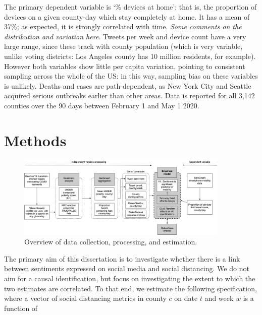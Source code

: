\documentclass{article}
\begin{document}
The primary dependent variable is `\% devices at home'; that is, the proportion of devices on a given county-day which stay completely at home. It has a mean of 37\%; as expected, it is strongly correlated with time. \textit{Some comments on the distribution and variation here}. Tweets per week and device count have a very large range, since these track with county population (which is very variable, unlike voting districts: Los Angeles county has 10 million residents, for example). However both variables show little per capita variation, pointing to consistent sampling across the whole of the US: in this way, sampling bias on these variables is unlikely. Deaths and cases are path-dependent, as New York City and Seattle acquired serious outbreaks earlier than other areas. Data is reported for all 3,142 counties over the 90 days between February 1 and May 1 2020.

\section{Methods}\label{methods}
\begin{figure}[!htb]
  \centering
  \caption{Overview of data collection, processing, and estimation.}\label{process}
  \includegraphics[width=0.9\textwidth]{figs/processing.png}
\end{figure}
The primary aim of this dissertation is to investigate whether there is a link between sentiments expressed on social media and social distancing. We do not aim for a causal identification, but focus on investigating the extent to which the two estimates are correlated. To that end, we estimate the following specification, where a vector of social distancing metrics in county \(c\) on date \(t\) and week \(w\) is a function of
\end{document}
